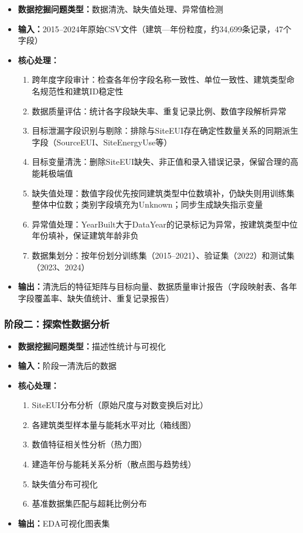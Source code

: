 \begin{itemize}
    \item \textbf{数据挖掘问题类型：}数据清洗、缺失值处理、异常值检测
    \item \textbf{输入：}2015--2024年原始CSV文件（建筑—年份粒度，约34,699条记录，47个字段）
    \item \textbf{核心处理：}
    \begin{enumerate}
        \item 跨年度字段审计：检查各年份字段名称一致性、单位一致性、建筑类型命名规范性和建筑ID稳定性
        \item 数据质量评估：统计各字段缺失率、重复记录比例、数值字段解析异常
        \item 目标泄漏字段识别与剔除：排除与SiteEUI存在确定性数量关系的同期派生字段（SourceEUI、SiteEnergyUse等）
        \item 目标变量清洗：删除SiteEUI缺失、非正值和录入错误记录，保留合理的高能耗极端值
        \item 缺失值处理：数值字段优先按同建筑类型中位数填补，仍缺失则用训练集整体中位数；类别字段填充为Unknown；同步生成缺失指示变量
        \item 异常值处理：YearBuilt大于DataYear的记录标记为异常，按建筑类型中位年份填补，保证建筑年龄非负
        \item 数据集划分：按年份划分训练集（2015--2021）、验证集（2022）和测试集（2023、2024）
    \end{enumerate}
    \item \textbf{输出：}清洗后的特征矩阵与目标向量、数据质量审计报告（字段映射表、各年字段覆盖率、缺失值统计、重复记录报告）
\end{itemize}

\subsubsection{阶段二：探索性数据分析}

\begin{itemize}
    \item \textbf{数据挖掘问题类型：}描述性统计与可视化
    \item \textbf{输入：}阶段一清洗后的数据
    \item \textbf{核心处理：}
    \begin{enumerate}
        \item SiteEUI分布分析（原始尺度与对数变换后对比）
        \item 各建筑类型样本量与能耗水平对比（箱线图）
        \item 数值特征相关性分析（热力图）
        \item 建造年份与能耗关系分析（散点图与趋势线）
        \item 缺失值分布可视化
        \item 基准数据集匹配与超耗比例分布
    \end{enumerate}
    \item \textbf{输出：}EDA可视化图表集
\end{itemize}

